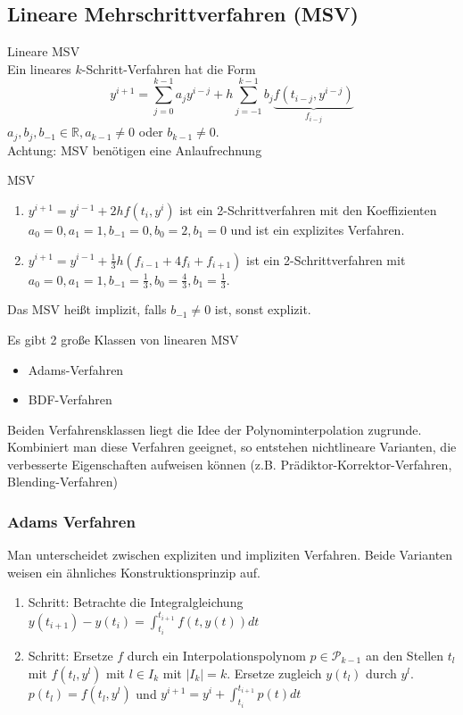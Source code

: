 \subsection{Lineare Mehrschrittverfahren (MSV)}
\begin{definition}
	[Definition IV.7] Lineare MSV
	\\
	Ein lineares $k$-Schritt-Verfahren hat die Form
	$$y^{i+1}=\sum_{j=0}^{k-1}a_{j}y^{i-j} + h\sum_{j=-1}^{k-1}b_{j}\underbrace{f(t_{i-j},y^{i-j})}_{f_{i-j}}$$
	$a_{j},b_{j},b_{-1}\in \mathbb{R},a_{k-1}\not = 0$ oder $b_{k-1}\not = 0$.
	\\
	Achtung: MSV benötigen eine Anlaufrechnung
\end{definition}

\begin{example} MSV
	\begin{enumerate}
		\item $y^{i+1}=y^{i-1}+2hf(t_{i},y^{i})$ ist ein 2-Schrittverfahren mit den Koeffizienten $a_{0}=0,a_{1}=1,b_{-1}=0,b_{0}=2,b_{1}=0$
		und ist ein explizites Verfahren.
		\item $y^{i+1}=y^{i-1}+\frac{1}{3}h(f_{i-1}+4f_{i}+f_{i+1})$ ist ein 2-Schrittverfahren mit $a_{0}=0,a_{1}=1,b_{-1}=\frac{1}{3},b_{0}=\frac{4}{3},b_{1}=\frac{1}{3}$.
	\end{enumerate}
\end{example}

\begin{remark}
	Das MSV heißt implizit, falls $b_{-1}\not = 0$ ist, sonst explizit.
\end{remark}

Es gibt 2 große Klassen von linearen MSV
\begin{itemize}
	\item Adams-Verfahren
	\item BDF-Verfahren
\end{itemize}

Beiden Verfahrensklassen liegt die Idee der Polynominterpolation zugrunde. Kombiniert man diese Verfahren geeignet, so entstehen
nichtlineare Varianten, die verbesserte Eigenschaften aufweisen können (z.B. Prädiktor-Korrektor-Verfahren, Blending-Verfahren)

\subsubsection{Adams Verfahren}
Man unterscheidet zwischen expliziten und impliziten Verfahren. Beide Varianten weisen ein ähnliches Konstruktionsprinzip auf.
\begin{enumerate}
	\item Schritt: Betrachte die Integralgleichung $y(t_{i+1})-y(t_{i})=\int_{t_{i}}^{t_{i+1}}f(t,y(t))dt$
	\item Schritt: Ersetze $f$ durch ein Interpolationspolynom $p \in \mathcal{P}_{k-1}$ an den Stellen $t_{l}$ mit $f(t_{l},y^{l})$ mit $l\in I_{k}$
	mit $|I_{k}|=k$. Ersetze zugleich $y(t_{l})$ durch $y^{l}$. $p(t_{l})=f(t_{l},y^{l})$ und $y^{i+1}=y^{i}+\int_{t_{i}}^{t_{i+1}}p(t)dt$
\end{enumerate}


